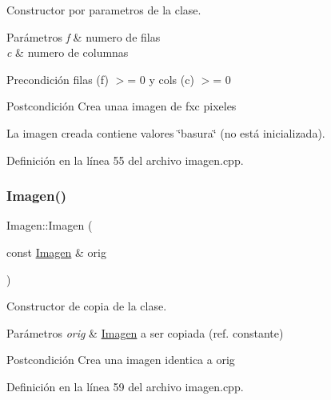Constructor por parametros de la clase. 


\begin{DoxyParams}{Parámetros}
{\em f} & numero de filas \\
\hline
{\em c} & numero de columnas \\
\hline
\end{DoxyParams}
\begin{DoxyPrecond}{Precondición}
filas (f) $>$= 0 y cols (c) $>$= 0 
\end{DoxyPrecond}
\begin{DoxyPostcond}{Postcondición}
Crea unaa imagen de fxc pixeles 

La imagen creada contiene valores \char`\"{}basura\char`\"{} (no está inicializada). 
\end{DoxyPostcond}


Definición en la línea 55 del archivo imagen.\+cpp.

\mbox{\label{classImagen_a987062737ac7faacc522370dbae3b224}} 
\subsubsection{\texorpdfstring{Imagen()}{Imagen()}\hspace{0.1cm}{\footnotesize\ttfamily [3/4]}}
{\footnotesize\ttfamily Imagen\+::\+Imagen (\begin{DoxyParamCaption}\item[{const \hyperlink{classImagen}{Imagen} \&}]{orig }\end{DoxyParamCaption})}



Constructor de copia de la clase. 


\begin{DoxyParams}{Parámetros}
{\em orig} & \hyperlink{classImagen}{Imagen} a ser copiada (ref. constante) \\
\hline
\end{DoxyParams}
\begin{DoxyPostcond}{Postcondición}
Crea una imagen identica a orig 
\end{DoxyPostcond}


Definición en la línea 59 del archivo imagen.\+cpp.

\mbox{\label{classImagen_a33a2993487ba11088d66acc31bb02ce3}} 
